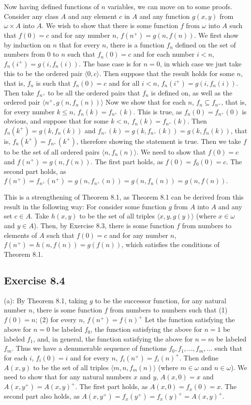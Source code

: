\documentclass{article}
\theoremstyle{definition}
\begin{document}
Now having defined functions of $n$ variables, we can move on to some proofs. Consider any class $A$ and any element 
$c$ in $A$ and any function $g(x,y)$ from $\omega\times A$ into $A$. We wish to show that there is some function $f$ from $\omega$ into $A$ such that $f(0)=c$ and for any number $n$, 
$f(n^+)=g(n,f(n))$. We first show by induction on $n$ that for every $n$, there is a function $f_n$ defined on the set of numbers from $0$ to $n$ such that $f_n(0)=c$ and 
for each number $i<n$, $f_n(i^+)=g(i,f_n(i))$. The base case is for $n=0$, in which case we just take this to be the ordered pair $\langle 0,c\rangle$. Then suppose that the result holds for some $n$, 
that is, $f_n$ is such that $f_n(0)=c$ and for all $i<n$, $f_n(i^+)=g(i,f_n(i))$. Then take $f_{n^+}$ to be all the ordered pairs that $f_n$ is defined on, as well as the ordered pair 
$\langle n^+,g(n,f_n(n))\rangle$ Now we show that for each $n$, $f_n\subseteq f_{n^+}$, that is, for every number $k\le n$, $f_n(k)=f_{n^+}(k)$. This is true, as $f_n(0)=f_{n^+}(0)$ is obvious, and 
suppose that for some $k<n$, $f_n(k)=f_{n^+}(k)$. Then $f_n(k^+)=g(k,f_n(k))$ and $f_{n^+}(k)=g(k,f_{n^+}(k))=g(k,f_n(k))$, that is, $f_n(k^+)=f_{n^+}(k^+)$, therefore showing the statement is true. 
Then we take $f$ to be the set of all ordered pairs $\langle n,f_n(n)\rangle$. We need to show that $f(0)=c$ and $f(n^+)=g(n, f(n))$. The first part holds, as 
$f(0)=f_0(0)=c$. The second part holds, as $f(n^+)=f_{n^+}(n^+)=g(n,f_{n^+}(n))=g(n,f_n(n))=g(n,f(n))$. 

This is a strengthening of Theorem 8.1, as Theorem 8.1 can be derived from this result in the following way: For consider some function $g$ from $A$ into $A$ and any set $c\in A$. 
Take $h(x,y)$ to be the set of all triples $\langle x,y,g(y)\rangle$ (where $x\in\omega$ and $y\in A$). Then, by Exercise 8.3, there is some function $f$ from numbers to elements of $A$ such that 
$f(0)=c$ and for any number $n$, $f(n^+)=h(n,f(n))=g(f(n))$, which satisfies the conditions of Theorem 8.1.

\subsection*{Exercise 8.4}
(a): By Theorem 8.1, taking $g$ to be the successor function, for any natural number $n$, there is some function $f$ from numbers to numbers 
such that\newline
(1) $f(0)=n$;\newline
(2) for every $n$, $f(n^+)=f(n)^+$\newline
Let the function satisfying the above for $n=0$ be labeled $f_0$, the function satisfying the above for $n=1$ be labeled $f_1$, and, in general, the function 
satisfying the above for $n=m$ be labeled $f_m$. Thus we have a denumerable sequence of functions $f_0,f_1,...,f_m,...$ such that for each $i$, 
$f_i(0)=i$ and for every $n$, $f_i(n^+)=f_i(n)^+$. Then define $A(x,y)$ to be the set of all 
triples $\langle m,n,f_m(n)\rangle$ (where $m\in\omega$ and $n\in\omega$). We need to show that for any natural numbers $x$ and $y$, $A(x,0)=x$ and $A(x,y^+)=A(x,y)^+$. 
The first part holds, as $A(x,0)=f_x(0)=x$. The second part also holds, as
$A(x,y^+)=f_x(y^+)=f_x(y)^+=A(x,y)^+$. 
\end{document}

